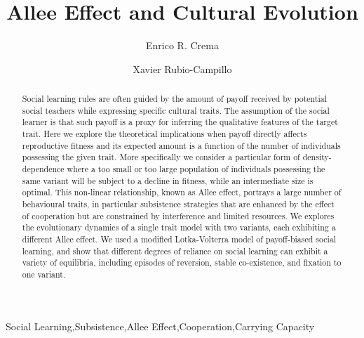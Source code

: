 \documentclass[preprint,authoryear]{elsarticle}
\begin{document}
\begin{frontmatter}

\title{Allee Effect and Cultural Evolution}


\author[label1,label2]{Enrico R. Crema}
\author[label3]{Xavier Rubio-Campillo}

\address[label1]{CaSEs - Complexity and Socio-Ecological Dynamics Research Group, Barcelona}
\address[label2]{UCL Institute of Archaeology}
\address[label3]{BSC - Barcelona Supercomputing Center}



\begin{abstract}
Social learning rules are often guided by the amount of payoff received by potential social teachers while expressing specific cultural traits. The assumption of the social learner is that such payoff is a proxy for inferring the qualitative features of the target trait. Here we explore the theoretical implications when payoff directly affects  reproductive fitness and its expected amount is a function of the number of individuals possessing the given trait. More specifically we consider a particular form of density-dependence where a too small or too large population of individuals possessing the same variant will be subject to a decline in fitness, while an intermediate size is optimal. This non-linear relationship, known as Allee effect, portrays a large number of behavioural traits, in particular subsistence strategies that are enhanced  by the effect of cooperation but are constrained by interference and limited resources. We  explores the evolutionary dynamics of a single trait model  with two variants, each exhibiting a different Allee effect. We used a modified Lotka-Volterra model of payoff-biased social learning, and show that different degrees of reliance on social learning can exhibit a variety of equilibria, including episodes of reversion, stable co-existence, and fixation to one variant.


\end{abstract}

\begin{keyword}
Social Learning\sep Subsistence\sep Allee Effect\sep Cooperation\sep Carrying Capacity
\end{keyword}

\end{frontmatter}
\end{document}
